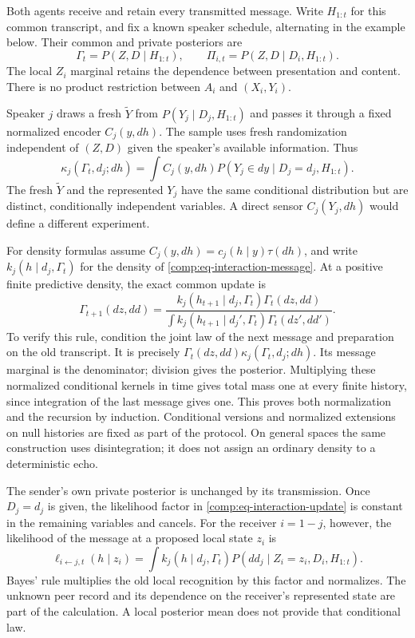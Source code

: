 Both agents receive and retain every transmitted message. Write $H_{1:t}$ for this common transcript, and fix a known speaker schedule, alternating in the example below. Their common and private posteriors are
\begin{equation}
\Gamma_t=P(Z,D\mid H_{1:t}),\qquad
\Pi_{i,t}=P(Z,D\mid D_i,H_{1:t}).
\label{comp:eq-interaction-posteriors}
\end{equation}
The local $Z_i$ marginal retains the dependence between presentation and content. There is no product restriction between $A_i$ and $(X_i,Y_i)$.

Speaker $j$ draws a fresh $\widetilde Y$ from $P(Y_j\mid D_j,H_{1:t})$ and passes it through a fixed normalized encoder $C_j(y,dh)$. The sample uses fresh randomization independent of $(Z,D)$ given the speaker's available information. Thus
\begin{equation}
\kappa_j(\Gamma_t,d_j;dh)
=\int C_j(y,dh)P(Y_j\in dy\mid D_j=d_j,H_{1:t}).
\label{comp:eq-interaction-message}
\end{equation}
The fresh $\widetilde Y$ and the represented $Y_j$ have the same conditional distribution but are distinct, conditionally independent variables. A direct sensor $C_j(Y_j,dh)$ would define a different experiment.

For density formulas assume $C_j(y,dh)=c_j(h\mid y)\tau(dh)$, and write $k_j(h\mid d_j,\Gamma_t)$ for the density of \cref{comp:eq-interaction-message}. At a positive finite predictive density, the exact common update is
\begin{equation}
\Gamma_{t+1}(dz,dd)
=\frac{k_j(h_{t+1}\mid d_j,\Gamma_t)\Gamma_t(dz,dd)}
{\int k_j(h_{t+1}\mid d_j',\Gamma_t)\Gamma_t(dz',dd')}.
\label{comp:eq-interaction-update}
\end{equation}
To verify this rule, condition the joint law of the next message and preparation on the old transcript. It is precisely $\Gamma_t(dz,dd)\kappa_j(\Gamma_t,d_j;dh)$. Its message marginal is the denominator; division gives the posterior. Multiplying these normalized conditional kernels in time gives total mass one at every finite history, since integration of the last message gives one. This proves both normalization and the recursion by induction. Conditional versions and normalized extensions on null histories are fixed as part of the protocol. On general spaces the same construction uses disintegration; it does not assign an ordinary density to a deterministic echo.

The sender's own private posterior is unchanged by its transmission. Once $D_j=d_j$ is given, the likelihood factor in \cref{comp:eq-interaction-update} is constant in the remaining variables and cancels. For the receiver $i=1-j$, however, the likelihood of the message at a proposed local state $z_i$ is
\begin{equation}
\ell_{i\leftarrow j,t}(h\mid z_i)
=\int k_j(h\mid d_j,\Gamma_t)
P(dd_j\mid Z_i=z_i,D_i,H_{1:t}).
\label{comp:eq-interaction-effective}
\end{equation}
Bayes' rule multiplies the old local recognition by this factor and normalizes. The unknown peer record and its dependence on the receiver's represented state are part of the calculation. A local posterior mean does not provide that conditional law.

